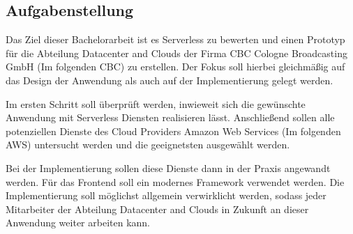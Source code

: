 \subsection{Aufgabenstellung}

Das Ziel dieser Bachelorarbeit ist es Serverless zu bewerten und einen Prototyp für die Abteilung Datacenter and Clouds der Firma CBC Cologne Broadcasting GmbH (Im folgenden \dq CBC\dq) zu erstellen.
Der Fokus soll hierbei gleichmäßig auf das Design der Anwendung als auch auf der Implementierung gelegt werden.

Im ersten Schritt soll überprüft werden, inwieweit sich die gewünschte Anwendung mit Serverless Diensten realisieren lässt.
Anschließend sollen alle potenziellen Dienste des Cloud Providers Amazon Web Services (Im folgenden \dq AWS\dq) untersucht werden und die geeignetsten ausgewählt werden.

Bei der Implementierung sollen diese Dienste dann in der Praxis angewandt werden. Für das Frontend soll ein modernes Framework verwendet werden.
Die Implementierung soll möglichst allgemein verwirklicht werden, sodass jeder Mitarbeiter der Abteilung Datacenter and Clouds in Zukunft an dieser Anwendung weiter arbeiten kann.

